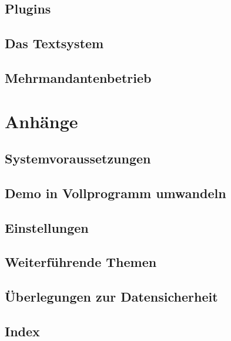 \documentclass[paper=a4,BCOR8.25mm,twoside]{scrbook}
\begin{document}
	
\chapter{Plugins}
	
	
	
	
	
\chapter{Das Textsystem}
	
	
	


\chapter{Mehrmandantenbetrieb}
	
	
\part{Anhänge}
\appendix

\chapter{Systemvoraussetzungen}
	

\chapter{Demo in Vollprogramm umwandeln}
	

\chapter{Einstellungen}
	

\chapter{Weiterführende Themen}
    

\chapter{Überlegungen zur Datensicherheit}	
	

\chapter{Index}
\printindex
\end{document}
